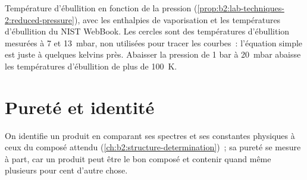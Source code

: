 \begin{omfigure}

{\small Température d'ébullition en fonction de la pression (\cref{prop:b2:lab-techniques-2:reduced-pressure}),
avec les enthalpies de vaporisation et les températures d'ébullition du NIST WebBook. Les cercles sont des
températures d'ébullition mesurées à 7 et \qty{13}{mbar}, non utilisées pour tracer les courbes~:
l'équation simple est juste à quelques kelvins près. Abaisser la pression de 1 bar à \qty{20}{mbar}
abaisse les températures d'ébullition de plus de
\qty{100}{K}.}
\end{omfigure}

\section{Pureté et identité}

On identifie un produit en comparant ses spectres et ses constantes physiques à ceux du composé attendu
(\cref{ch:b2:structure-determination})~; sa pureté se mesure à part, car un produit peut être le bon
composé et contenir quand même plusieurs pour cent d'autre chose.

